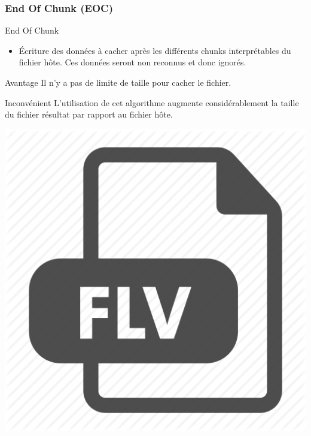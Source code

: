 \documentclass{beamer}
\begin{document}
    \subsubsection{End Of Chunk (EOC)}
    \begin{frame}
    
	\begin{block}{End Of Chunk}
	\begin{itemize}
	[circle]
	\item Écriture des données à cacher après les différents chunks interprétables 
	du fichier hôte. Ces données seront non reconnus et donc ignorés.  
	\end{itemize}
	\end{block}
	
	\begin{exampleblock}{Avantage} 
	Il n'y a pas de limite de taille pour cacher le fichier. 
	\end{exampleblock}
	
	\begin{alertblock}{Inconvénient} 
	L'utilisation de cet algorithme augmente considérablement la taille du 
	fichier résultat par rapport au fichier hôte. 
	\end{alertblock}
	
	\hspace{4.3cm}
    \includegraphics[scale=0.08]{pictures/flv_512.png}
    
    \end{frame}
  
\end{document}
